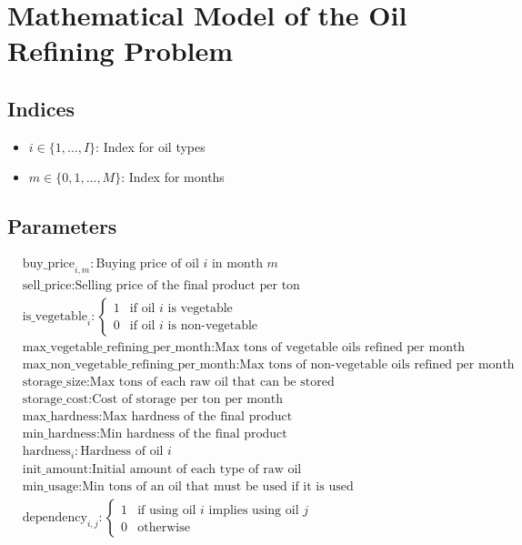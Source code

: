 \documentclass{article}
\begin{document}
\section*{Mathematical Model of the Oil Refining Problem}

\subsection*{Indices}
\begin{itemize}
    \item $i \in \{1, \ldots, I\}$: Index for oil types
    \item $m \in \{0, 1, \ldots, M\}$: Index for months
\end{itemize}

\subsection*{Parameters}
\begin{align*}
    & \text{buy\_price}_{i,m}: \text{Buying price of oil } i \text{ in month } m \\
    & \text{sell\_price}: \text{Selling price of the final product per ton} \\
    & \text{is\_vegetable}_{i}: \begin{cases} 
        1 & \text{if oil } i \text{ is vegetable} \\ 
        0 & \text{if oil } i \text{ is non-vegetable} 
    \end{cases} \\
    & \text{max\_vegetable\_refining\_per\_month}: \text{Max tons of vegetable oils refined per month} \\
    & \text{max\_non\_vegetable\_refining\_per\_month}: \text{Max tons of non-vegetable oils refined per month} \\
    & \text{storage\_size}: \text{Max tons of each raw oil that can be stored} \\
    & \text{storage\_cost}: \text{Cost of storage per ton per month} \\
    & \text{max\_hardness}: \text{Max hardness of the final product} \\
    & \text{min\_hardness}: \text{Min hardness of the final product} \\
    & \text{hardness}_{i}: \text{Hardness of oil } i \\
    & \text{init\_amount}: \text{Initial amount of each type of raw oil} \\
    & \text{min\_usage}: \text{Min tons of an oil that must be used if it is used} \\
    & \text{dependency}_{i,j}: \begin{cases} 
        1 & \text{if using oil } i \text{ implies using oil } j \\ 
        0 & \text{otherwise} 
    \end{cases}
\end{align*}
\end{document}
